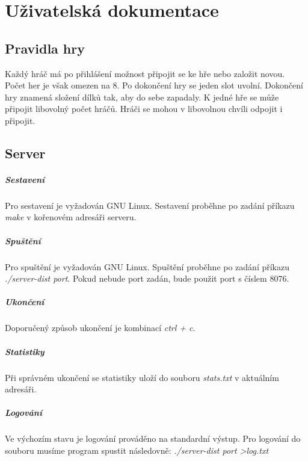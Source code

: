 \documentclass[12pt, a4paper]{report}
\begin{document}
\chapter{Uživatelská dokumentace}

\section{Pravidla hry}
Každý hráč má po přihlášení možnost připojit se ke hře nebo založit novou. Počet her je však omezen na 8. Po dokončení hry se jeden slot uvolní. Dokončení hry znamená složení dílků tak, aby do sebe zapadaly. K jedné hře se může připojit libovolný počet hráčů. Hráči se mohou v libovolnou chvíli odpojit i připojit.

\section{Server}

\paragraph{Sestavení}
Pro sestavení je vyžadován GNU Linux.
Sestavení proběhne po zadání příkazu \emph{make} v kořenovém adresáři serveru.

\paragraph{Spuštění}
Pro spuštění je vyžadován GNU Linux.
Spuštění proběhne po zadání příkazu \emph{./server-dist port}.
Pokud nebude port zadán, bude použit port s číslem 8076.

\paragraph{Ukončení}
Doporučený způsob ukončení je kombinací \emph{ctrl + c}.

\paragraph{Statistiky}
Při správném ukončení se statistiky uloží do souboru \emph{stats.txt} v aktuálním adresáři.

\paragraph{Logování}
Ve výchozím stavu je logování prováděno na standardní výstup. Pro logování do souboru musíme program spustit následovně: \emph{./server-dist port \textgreater log.txt}
\end{document}
